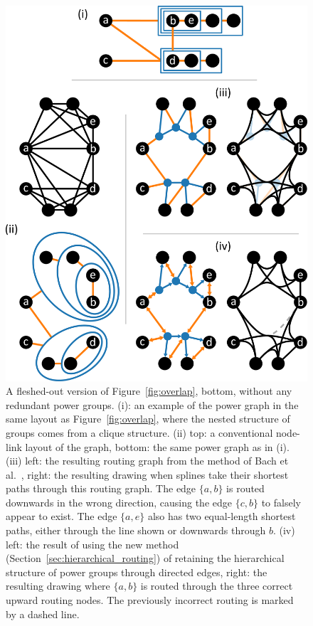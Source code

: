 \begin{figure}
  \centering
  \includegraphics[width=.8\linewidth]{power/shortcircuit_big.pdf}
  \caption[A full version of Figure~\ref{fig:overlap}]{A fleshed-out version of Figure~\ref{fig:overlap}, bottom, without any redundant power groups.
  (i): an example of the power graph in the same layout as Figure~\ref{fig:overlap}, where the nested structure of groups comes from a clique structure.
  (ii) top: a conventional node-link layout of the graph, bottom: the same power graph as in (i). 
  (iii) left: the resulting routing graph from the method of Bach et al.\ \cite{Bach2017}, right: the resulting drawing when splines take their shortest paths through this routing graph. The edge $\{a,b\}$ is routed downwards in the wrong direction, causing the edge $\{c,b\}$ to falsely appear to exist.
  The edge $\{a,e\}$ also has two equal-length shortest paths, either through the line shown or downwards through $b$.
  (iv) left: the result of using the new method (Section~\ref{sec:hierarchical_routing}) of retaining the hierarchical structure of power groups through directed edges, right: the resulting drawing where $\{a,b\}$ is routed through the three correct upward routing nodes. The previously incorrect routing is marked by a dashed line.
  }
  \label{fig:overlap_sm}
\end{figure}
